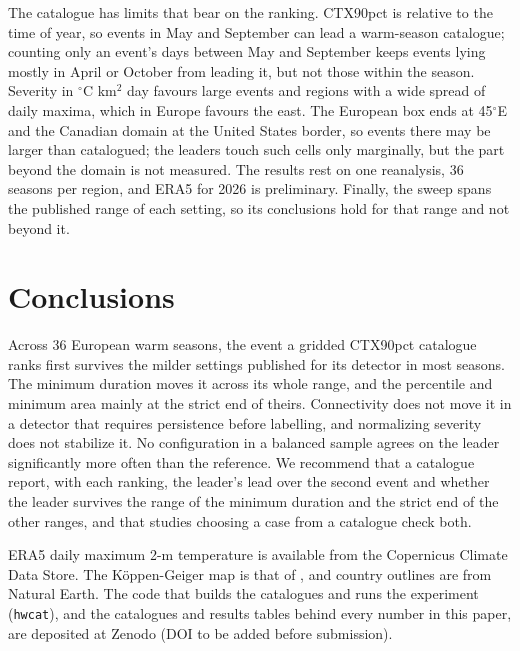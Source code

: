 \documentclass{amsdraft}
\begin{document}
The catalogue has limits that bear on the ranking. CTX90pct is relative to
the time of year, so events in May and September can lead a warm-season
catalogue; counting only an event's days between May and September keeps
events lying mostly in April or October from leading it, but not those
within the season. Severity in $^\circ$C km$^2$ day favours large events and
regions with a wide spread of daily maxima, which in Europe favours the
east. The European box ends at 45$^\circ$E and the Canadian domain at the
United States border, so events there may be larger than catalogued; the
leaders touch such cells only marginally, but the part beyond the domain is
not measured. The results rest on one reanalysis, 36 seasons per region, and
ERA5 for 2026 is preliminary. Finally, the sweep spans the published range
of each setting, so its conclusions hold for that range and not beyond it.

\section{Conclusions}
\label{sec:conclusions}

Across 36 European warm seasons, the event a gridded CTX90pct
catalogue ranks first survives the milder settings published for its
detector in most seasons. The minimum duration moves it across its whole
range, and the percentile and minimum area mainly at the strict end of
theirs. Connectivity does not
move it in a detector that requires persistence before labelling, and
normalizing severity does not stabilize it. No configuration in a
balanced sample agrees on the leader significantly more often than the
reference. We recommend that a catalogue report, with each ranking, the
leader's lead over the second event and whether the leader survives the
range of the minimum duration and the strict end of the other ranges, and
that studies choosing a case from a catalogue check both.

\datastatement
ERA5 daily maximum 2-m temperature \citep{Hersbach2020} is available from
the Copernicus Climate Data Store. The K\"oppen-Geiger map is that of
\citet{Beck2023}, and country outlines are from Natural Earth. The code that
builds the catalogues and runs the experiment (\texttt{hwcat}), and the
catalogues and results tables behind every number in this paper, are
deposited at Zenodo (DOI to be added before submission).



\end{document}
